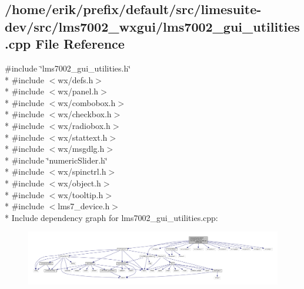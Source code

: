 \subsection{/home/erik/prefix/default/src/limesuite-\/dev/src/lms7002\+\_\+wxgui/lms7002\+\_\+gui\+\_\+utilities.cpp File Reference}
\label{lms7002__gui__utilities_8cpp}
{\ttfamily \#include \char`\"{}lms7002\+\_\+gui\+\_\+utilities.\+h\char`\"{}}\\*
{\ttfamily \#include $<$wx/defs.\+h$>$}\\*
{\ttfamily \#include $<$wx/panel.\+h$>$}\\*
{\ttfamily \#include $<$wx/combobox.\+h$>$}\\*
{\ttfamily \#include $<$wx/checkbox.\+h$>$}\\*
{\ttfamily \#include $<$wx/radiobox.\+h$>$}\\*
{\ttfamily \#include $<$wx/stattext.\+h$>$}\\*
{\ttfamily \#include $<$wx/msgdlg.\+h$>$}\\*
{\ttfamily \#include \char`\"{}numeric\+Slider.\+h\char`\"{}}\\*
{\ttfamily \#include $<$wx/spinctrl.\+h$>$}\\*
{\ttfamily \#include $<$wx/object.\+h$>$}\\*
{\ttfamily \#include $<$wx/tooltip.\+h$>$}\\*
{\ttfamily \#include $<$lms7\+\_\+device.\+h$>$}\\*
Include dependency graph for lms7002\+\_\+gui\+\_\+utilities.\+cpp\+:
\nopagebreak
\begin{figure}[H]
\begin{center}
\leavevmode
\includegraphics[width=350pt]{d2/d9e/lms7002__gui__utilities_8cpp__incl}
\end{center}
\end{figure}
